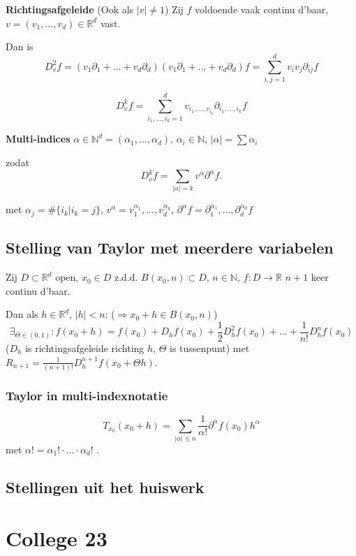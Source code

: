 \documentclass[a4paper]{exam}
\theoremstyle{definition}
\newcommand{\naturals}{\mathbb{N}}
\newcommand{\reals}{\mathbb{R}}
\begin{document}
			 \textbf{Richtingsafgeleide} (Ook als $|v|\neq 1$)
			Zij $f$ voldoende vaak continu d'baar, $v=(v_1,...,v_d) \in \reals^d$ vast.
			
			Dan is \[ D_v^2 f = (v_1 \partial_1 + ... + v_d \partial_d)(v_1 \partial_1 + ... + v_d \partial_d)f = \sum_{i,j=1}^{d} v_i v_j \partial_{ij}f \]
			
			\[ D_v^k f = \sum_{i_1,...,i_k=1}^{d} v_{{i_1},...,v_{i_k}} \partial_{i_1,...,i_k} f \]
			
			\nota \textbf{Multi-indices} $ \alpha \in \naturals^d = (\alpha_1 ,..., \alpha_d) $, $\alpha_i \in \naturals$, $ |\alpha| = \sum \alpha_i $
			
			zodat \[ D_v^k f = \sum_{|\alpha|=k} v^\alpha \partial^\alpha f. \]
			
			met $ \alpha_j = \#\{i_k | i_k = j\} $, $ v^\alpha = v_1^{\alpha_1} ,..., v_d^{\alpha_k} $, $ \partial^\alpha f = \partial_1^{\alpha_1},...,\partial_d^{\alpha_d} f $
			
		\subsection{Stelling van Taylor met meerdere variabelen}
			\theorem Zij  $D \subset \reals^d$ open, $x_0 \in D$ z.d.d. $B(x_0,n) \subset D$, $n\in \naturals$, $f:D\to \reals$ $n+1$ keer continu d'baar.
			
			Dan als $h \in \reals^d$, $ |h|<n $: ($\Rightarrow x_0+h \in B(x_0,n)$)
			\[ \exists_{\Theta \in (0,1)}:f(x_0+h) = f(x_0) + D_h f(x_0) + \frac{1}{2} D_h^2 f(x_0) + \dots + \frac{1}{n!} D_h^n f(x_0) \]
			($D_h$ is richtingsafgeleide richting $h$, $\Theta$ is tussenpunt)
			met $R_{n+1} = \frac{1}{(n+1)!}D_h^{n+1} f(x_0 + \Theta h)$.
		
			\subsubsection{Taylor in multi-indexnotatie}
				\[ T_{x_0} (x_0 + h) = \sum_{|\alpha|\le n} \frac{1}{\alpha !} \partial^\alpha f(x_0)h^\alpha \] met $ \alpha ! = \alpha_1 ! \cdot ... \cdot \alpha_d !$ .
		
		\subsection{Stellingen uit het huiswerk}
			
	\newpage
	\section{College 23}
\end{document}
